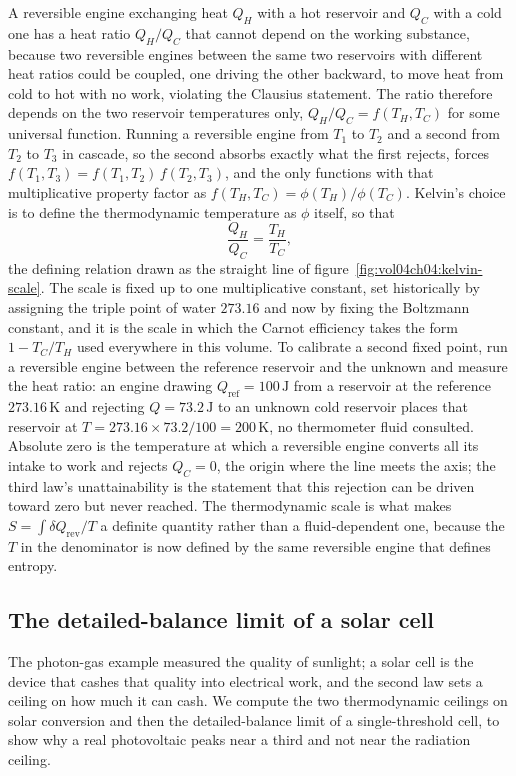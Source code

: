 A reversible engine exchanging heat $Q_H$ with a hot reservoir and $Q_C$ with a
cold one has a heat ratio $Q_H/Q_C$ that cannot depend on the working substance,
because two reversible engines between the same two reservoirs with different heat
ratios could be coupled, one driving the other backward, to move heat from cold to
hot with no work, violating the Clausius statement. The ratio therefore depends on
the two reservoir temperatures only, $Q_H/Q_C = f(T_H, T_C)$ for some universal
function. Running a reversible engine from $T_1$ to $T_2$ and a second from $T_2$
to $T_3$ in cascade, so the second absorbs exactly what the first rejects, forces
$f(T_1, T_3) = f(T_1, T_2)\,f(T_2, T_3)$, and the only functions with that
multiplicative property factor as $f(T_H, T_C) = \phi(T_H)/\phi(T_C)$. Kelvin's
choice is to define the thermodynamic temperature as $\phi$ itself, so that
\[
\frac{Q_H}{Q_C} = \frac{T_H}{T_C},
\]
the defining relation drawn as the straight line of
figure~\ref{fig:vol04ch04:kelvin-scale}. The scale is fixed up to one multiplicative
constant, set historically by assigning the triple point of water $273.16$ and now
by fixing the Boltzmann constant, and it is the scale in which the Carnot efficiency
takes the form $1 - T_C/T_H$ used everywhere in this volume. To calibrate a second
fixed point, run a reversible engine between the reference reservoir and the unknown
and measure the heat ratio: an engine drawing $Q_{\text{ref}} = 100\,\text{J}$ from
a reservoir at the reference $273.16\,\si{\kelvin}$ and rejecting $Q = 73.2\,\text{J}$
to an unknown cold reservoir places that reservoir at $T = 273.16 \times 73.2/100 =
200\,\si{\kelvin}$, no thermometer fluid consulted. Absolute zero is the temperature
at which a reversible engine converts all its intake to work and rejects $Q_C = 0$,
the origin where the line meets the axis; the third law's unattainability is the
statement that this rejection can be driven toward zero but never reached. The
thermodynamic scale is what makes $S = \int \delta Q_{\text{rev}}/T$ a definite
quantity rather than a fluid-dependent one, because the $T$ in the denominator is
now defined by the same reversible engine that defines entropy.

\subsection{The detailed-balance limit of a solar cell}

The photon-gas example measured the quality of sunlight; a solar cell is the device
that cashes that quality into electrical work, and the second law sets a ceiling on
how much it can cash. We compute the two thermodynamic ceilings on solar conversion
and then the detailed-balance limit of a single-threshold cell, to show why a real
photovoltaic peaks near a third and not near the radiation ceiling.

